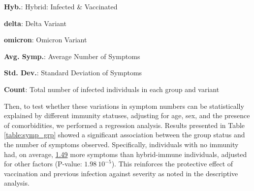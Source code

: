 \documentclass[11pt]{article}
\begin{document}
\begin{table}[h]
\begin{threeparttable}
\begin{tablenotes}
\item \textbf{Hyb.}: Hybrid: Infected \& Vaccinated
\item \textbf{delta}: Delta Variant
\item \textbf{omicron}: Omicron Variant
\item \textbf{Avg. Symp.}: Average Number of Symptoms
\item \textbf{Std. Dev.}: Standard Deviation of Symptoms
\item \textbf{Count}: Total number of infected individuals in each group and variant
\end{tablenotes}
\end{threeparttable}
\end{table}

Then, to test whether these variations in symptom numbers can be statistically explained by different immunity statuses, adjusting for age, sex, and the presence of comorbidities, we performed a regression analysis. Results presented in Table \ref{table:symp_grp} showed a significant association between the group status and the number of symptoms observed. Specifically, individuals with no immunity had, on average, \hyperlink{B2a}{1.49} more symptoms than hybrid-immune individuals, adjusted for other factors (P-value: \hyperlink{B2b}{$1.98\ 10^{-5}$}). This reinforces the protective effect of vaccination and previous infection against severity as noted in the descriptive analysis.
\end{document}
